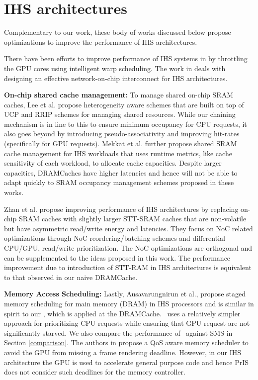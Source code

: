 \section{IHS architectures}
Complementary to our work, these body of works discussed below propose optimizations to improve the performance of IHS architectures. 
\par There have been efforts to improve performance of IHS systems in \cite{gpu-concurrency} by throttling the GPU cores using intelligent warp scheduling. The work in \cite{interconnect} deals with designing an effective network-on-chip interconnect for IHS architectures. 
\par \textbf{On-chip shared cache management:} To manage shared on-chip SRAM caches, Lee et al. \cite{tap}  propose heterogeneity aware schemes that are built on top of UCP and RRIP schemes for managing shared resources. While our chaining mechanism is in line to this to ensure minimum occupancy for CPU requests, it also goes beyond by introducing pseudo-associativity and improving hit-rates (specifically for GPU requests). Mekkat et al. \cite{helm} further propose shared SRAM cache management for IHS workloads that uses runtime metrics, like cache sensitivity of each workload, to allocate cache capacities. Despite larger capacities, DRAMCaches have higher latencies and hence will not be able to adapt quickly to SRAM occupancy management schemes proposed in these works. 
\par Zhan et al. \cite{oscar} propose improving performance of IHS architectures by replacing on-chip SRAM caches with slightly larger STT-SRAM caches that are non-volatile but have asymmetric read/write energy and latencies. They focus on NoC related optimizations through NoC reordering/batching schemes and differential CPU/GPU, read/write prioritization. The NoC optimizations are orthogonal and can be supplemented to the ideas proposed in this work. The performance improvement due to introduction of STT-RAM in IHS architectures is equivalent to that observed in our naive DRAMCache.
\par \textbf{Memory Access Scheduling:} Lastly, Ausavarungnirun et al., \cite{sms} propose staged memory scheduling for main memory (DRAM) in IHS processors and is similar in spirit to our \prioname, which is applied at the DRAMCache. \prioname\ uses a relatively simpler approach for prioritizing CPU requests while ensuring that GPU request are not significantly starved. We also compare the performance of \cachename\ against SMS in Section \ref{comparison}. The authors in \cite{qos-aware} propose a QoS aware memory scheduler to avoid the GPU from missing a frame rendering deadline. However, in our IHS architecture the GPU is used to accelerate general purpose code and hence PrIS does not consider such deadlines for the memory controller.
